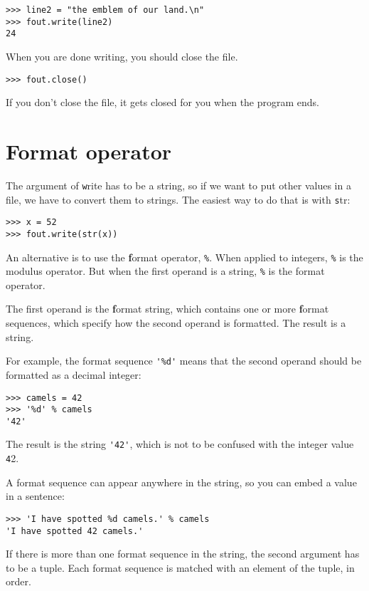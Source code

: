 \documentclass[
DIV=11,
fontsize=13,
twoside,
headinclude=false,
titlepage=firstiscover,
abstract=true,
headsepline=true,
footsepline=true,
chapterprefix=true, %
headings=big,
bibliography=totoc,%
captions=tableheading
]{scrbook}
\theoremstyle{definition}
\begin{document}
\begin{lstlisting}
>>> line2 = "the emblem of our land.\n"
>>> fout.write(line2)
24
\end{lstlisting}
%
When you are done writing, you should close the file.

\begin{lstlisting}
>>> fout.close()
\end{lstlisting}
%
%
If you don't close the file, it gets closed for you when the
program ends.


\section{Format operator}

The argument of {\texttt write} has to be a string, so if we want
to put other values in a file, we have to convert them to
strings.  The easiest way to do that is with {\texttt str}:

\begin{lstlisting}
>>> x = 52
>>> fout.write(str(x))
\end{lstlisting}
%
An alternative is to use the {\textbf format operator}, {\texttt \%}.  When
applied to integers, {\texttt \%} is the modulus operator.  But
when the first operand is a string, {\texttt \%} is the format operator.

The first operand is the {\textbf format string}, which contains
one or more {\textbf format sequences}, which
specify how
the second operand is formatted.  The result is a string.

For example, the format sequence \verb"'%d'" means that
the second operand should be formatted as a decimal
integer:

\begin{lstlisting}
>>> camels = 42
>>> '%d' % camels
'42'
\end{lstlisting}
%
The result is the string \verb"'42'", which is not to be confused
with the integer value {\texttt 42}.

A format sequence can appear anywhere in the string,
so you can embed a value in a sentence:

\begin{lstlisting}
>>> 'I have spotted %d camels.' % camels
'I have spotted 42 camels.'
\end{lstlisting}
%
If there is more than one format sequence in the string,
the second argument has to be a tuple.  Each format sequence is
matched with an element of the tuple, in order.
\end{document}
